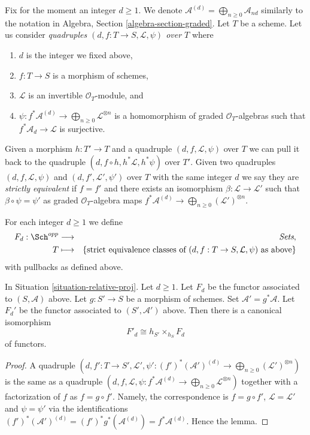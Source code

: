 \medskip\noindent
Fix for the moment an integer $d \geq 1$.
We denote $\mathcal{A}^{(d)} = \bigoplus_{n \geq 0} \mathcal{A}_{nd}$
similarly to the notation in Algebra, Section \ref{algebra-section-graded}.
Let $T$ be a scheme.
Let us consider {\it quadruples $(d, f : T \to S, \mathcal{L}, \psi)$
over $T$} where
\begin{enumerate}
\item $d$ is the integer we fixed above,
\item $f : T \to S$ is a morphism of schemes,
\item $\mathcal{L}$ is an invertible $\mathcal{O}_T$-module, and
\item
$\psi : f^*\mathcal{A}^{(d)} \to \bigoplus_{n \geq 0}\mathcal{L}^{\otimes n}$
is a homomorphism of graded $\mathcal{O}_T$-algebras
such that $f^*\mathcal{A}_d \to \mathcal{L}$ is surjective.
\end{enumerate}
Given a morphism $h : T' \to T$ and a quadruple
$(d, f, \mathcal{L}, \psi)$ over $T$ we can pull it back to the
quadruple $(d, f \circ h, h^*\mathcal{L}, h^*\psi)$ over $T'$.
Given two quadruples $(d, f, \mathcal{L}, \psi)$ and
$(d, f', \mathcal{L}', \psi')$ over $T$ with the same integer $d$
we say they are {\it strictly equivalent} if $f = f'$ and there exists
an isomorphism $\beta : \mathcal{L} \to \mathcal{L}'$
such that $\beta \circ \psi = \psi'$ as graded $\mathcal{O}_T$-algebra maps
$f^*\mathcal{A}^{(d)} \to \bigoplus_{n \geq 0} (\mathcal{L}')^{\otimes n}$.

\medskip\noindent
For each integer $d \geq 1$ we define
\begin{eqnarray*}
F_d : \Sch^{opp} & \longrightarrow & \textit{Sets}, \\
T & \longmapsto &
\{\text{strict equivalence classes of }
(d, f : T \to S, \mathcal{L}, \psi)
\text{ as above}\}
\end{eqnarray*}
with pullbacks as defined above.

\begin{lemma}
\label{lemma-proj-base-change}
In Situation \ref{situation-relative-proj}. Let $d \geq 1$.
Let $F_d$ be the functor
associated to $(S, \mathcal{A})$ above.
Let $g : S' \to S$ be a morphism of schemes.
Set $\mathcal{A}' = g^*\mathcal{A}$. Let $F_d'$ be the
functor associated to $(S', \mathcal{A}')$ above.
Then there is a canonical isomorphism
$$
F'_d \cong h_{S'} \times_{h_S} F_d
$$
of functors.
\end{lemma}

\begin{proof}
A quadruple
$(d, f' : T \to S', \mathcal{L}',
\psi' : (f')^*(\mathcal{A}')^{(d)} \to
\bigoplus_{n \geq 0} (\mathcal{L}')^{\otimes n})$
is the same as a quadruple
$(d, f, \mathcal{L},
\psi : f^*\mathcal{A}^{(d)} \to
\bigoplus_{n \geq 0} \mathcal{L}^{\otimes n})$
together with a factorization of $f$ as $f = g \circ f'$. Namely,
the correspondence is $f = g \circ f'$, $\mathcal{L} = \mathcal{L}'$
and $\psi = \psi'$ via the identifications
$(f')^*(\mathcal{A}')^{(d)} = (f')^*g^*(\mathcal{A}^{(d)}) =
f^*\mathcal{A}^{(d)}$. Hence the lemma.
\end{proof}


